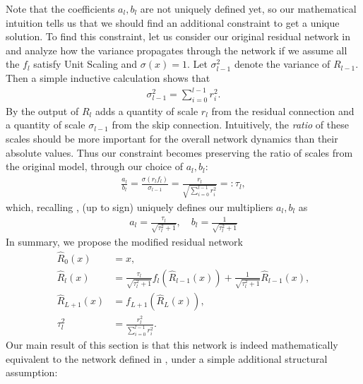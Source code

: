 Note that the coefficients $a_l, b_l$ are not uniquely defined yet, so our mathematical intuition tells us that we should find an additional constraint to get a unique solution. To find this constraint, let us consider our original residual network in  and analyze how the variance propagates through the network if we assume all the $f_l$ satisfy Unit Scaling and $\sigma(x) = 1$. Let $\sigma_{l-1}^2$ denote the variance of $R_{l-1}$. Then a simple inductive calculation shows that
\begin{align*}
    \sigma_{l-1}^2 =  \sum_{i=0}^{l-1}r_i^2.
\end{align*}
By  the output of $R_l$ adds a quantity of scale $r_l$ from the residual connection and a quantity of scale $\sigma_{l-1}$ from the skip connection. Intuitively, the \textit{ratio} of these scales should be more important for the overall network dynamics than their absolute values. Thus our constraint becomes preserving the ratio of scales from the original model, through our choice of $a_l, b_l$:
\begin{align*}
    \frac{a_l}{b_l} = \frac{\sigma(r_l f_l)}{\sigma_{l-1}} = \frac{r_l}{\sqrt{\sum_{i=0}^{l-1}r_i^2}} =: \tau_l,
\end{align*}
which, recalling , (up to sign) uniquely defines our multipliers $a_l, b_l$ as 
\begin{align}
    a_l = \frac{\tau_l}{\sqrt{\tau_l^2 + 1}}, \quad b_l = \frac{1}{\sqrt{\tau_l^2 + 1}}
\end{align}
In summary, we propose the modified residual network
\begin{align}
    \hat{R}_0(x) &= x, \label{eq:umup_resnet_a}
    \\
    \hat{R}_{l}(x) &= \frac{\tau_l}{\sqrt{\tau_l^2 + 1}}f_l(\hat{R}_{l-1}(x)) + \frac{1}{\sqrt{\tau_l^2 + 1}}\hat{R}_{l-1}(x), \label{eq:umup_resnet_b}
    \\
    \hat{R}_{L+1}(x) &= f_{L+1}(\hat{R}_L(x)),  \label{eq:umup_resnet_c}
    \\
    \tau^2_l &= \frac{r^2_l}{\sum_{i=0}^{l-1}r_i^2}. \label{eq:umup_resnet_d}
\end{align}
Our main result of this section is that this network is indeed mathematically equivalent to the network defined in , under a simple additional structural assumption:

